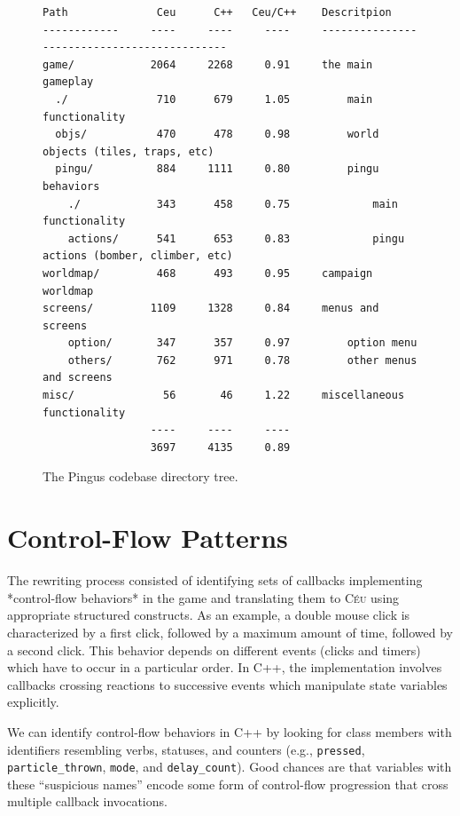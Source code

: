 \documentclass{vgtc}                          %
\newcommand{\CEU}{\textsc{C\'{e}u}\xspace}
\newcommand{\code}[1] {{\small{\texttt{#1}}}}
\begin{document}
\begin{figure}[t]
\begin{verbatim}
Path              Ceu      C++   Ceu/C++    Descritpion
------------     ----     ----     ----     --------------------------------------------
game/            2064     2268     0.91     the main gameplay
  ./              710      679     1.05         main functionality
  objs/           470      478     0.98         world objects (tiles, traps, etc)
  pingu/          884     1111     0.80         pingu behaviors
    ./            343      458     0.75             main functionality
    actions/      541      653     0.83             pingu actions (bomber, climber, etc)
worldmap/         468      493     0.95     campaign worldmap
screens/         1109     1328     0.84     menus and screens
    option/       347      357     0.97         option menu
    others/       762      971     0.78         other menus and screens
misc/              56       46     1.22     miscellaneous functionality
                 ----     ----     ----
                 3697     4135     0.89
\end{verbatim}
\caption{The Pingus codebase directory tree.
\label{tab.tree}
}
\end{figure}


\section{Control-Flow Patterns}

The rewriting process consisted of identifying sets of callbacks implementing
*control-flow behaviors* in the game and translating them to \CEU using
appropriate structured constructs.
As an example, a double mouse click is characterized by a first click, followed
by a maximum amount of time, followed by a second click.
This behavior depends on different events (clicks and timers) which have to
occur in a particular order.
In C++, the implementation involves callbacks crossing reactions to successive
events which manipulate state variables explicitly.

We can identify control-flow behaviors in C++ by looking for class members with
identifiers resembling verbs, statuses, and counters (e.g.,
\code{pressed},
\code{particle\_thrown},
\code{mode}, and
\code{delay\_count}).
Good chances are that variables with these ``suspicious names'' encode some
form of control-flow progression that cross multiple callback invocations.
\end{document}
